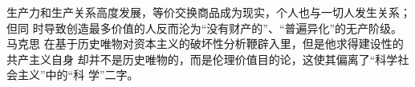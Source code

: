 

生产力和生产关系高度发展，等价交换商品成为现实，个人也与一切人发生关系；但同
时导致创造最多价值的人反而沦为“没有财产的”、“普遍异化”的无产阶级。马克思
在基于历史唯物对资本主义的破坏性分析鞭辟入里，但是他求得建设性的共产主义自身
却并不是历史唯物的，而是伦理价值目的论，这使其偏离了“科学社会主义”中的“科
学”二字。


